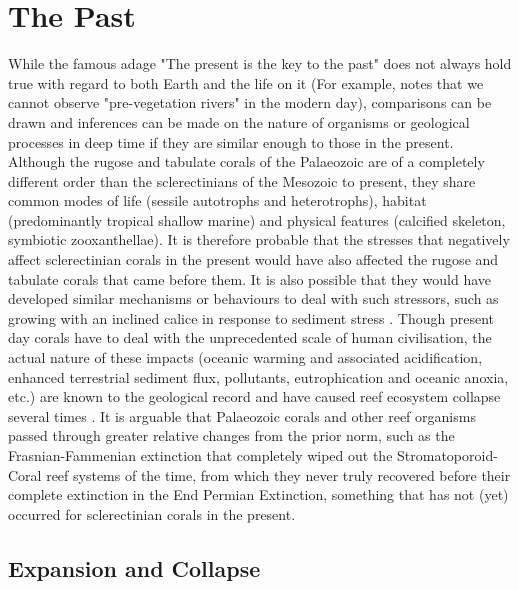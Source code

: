 \documentclass[11pt,a4paper]{article}
\begin{document}
\section{The Past}


While the famous adage "The present is the key to the past" \citep{Lyell_1837} does not always hold true with regard to both Earth and the life on it (For example, \cite{McMahon2018b} notes that we cannot observe "pre-vegetation rivers" in the modern day), comparisons can be drawn and inferences can be made on the nature of organisms or geological processes in deep time if they are similar enough to those in the present.
 Although the rugose and tabulate corals of the Palaeozoic are of a completely different order than the sclerectinians of the Mesozoic to present, they share common modes of life (sessile autotrophs and heterotrophs), habitat (predominantly tropical shallow marine) and physical features (calcified skeleton, symbiotic zooxanthellae).
  It is therefore probable that the stresses that negatively affect sclerectinian corals in the present would have also affected the rugose and tabulate corals that came before them.
    It is also possible that they would have developed similar mechanisms or behaviours to deal with such stressors, such as growing with an inclined calice in response to sediment stress \citep{Logan1988}.
     Though present day corals have to deal with the unprecedented scale of human civilisation, the actual nature of these impacts (oceanic warming and associated acidification, enhanced terrestrial sediment flux, pollutants, eutrophication and oceanic anoxia, etc.) are known to the geological record and have caused reef ecosystem collapse several times \citep{Lipps2016photosynthesis}.
  It is arguable that Palaeozoic corals and other reef organisms passed through greater relative changes from the prior norm, such as the Frasnian-Fammenian extinction that completely wiped out the Stromatoporoid-Coral reef systems of the time, from which they never truly recovered before their complete extinction in the End Permian Extinction, something that has not (yet) occurred for sclerectinian corals in the present. 


\subsection{Expansion and Collapse}
\end{document}
